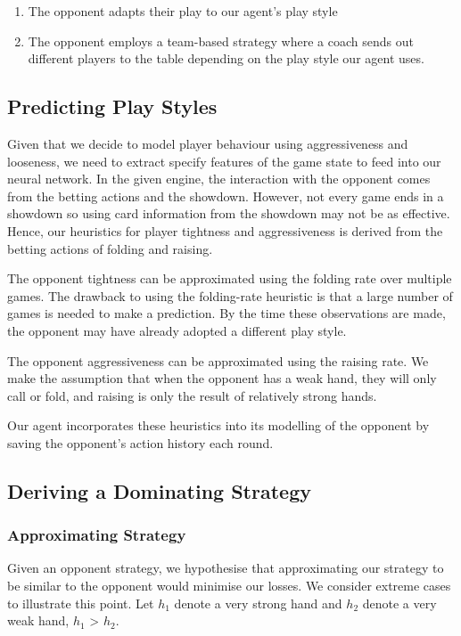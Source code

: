 \documentclass{article}
\begin{document}
\begin{enumerate}
	\item The opponent adapts their play to our agent's play style
	\item The opponent employs a team-based strategy where a coach sends out different players to the table depending on the play style our agent uses.
\end{enumerate}

\subsection{Predicting Play Styles}
Given that we decide to model player behaviour using aggressiveness and looseness, we need to extract specify features of the game state to feed into our neural network. In the given engine, the interaction with the opponent comes from the betting actions and the showdown. However, not every game ends in a showdown so using card information from the showdown may not be as effective. Hence, our heuristics for player tightness and aggressiveness is derived from the betting actions of folding and raising.

The opponent tightness can be approximated using the folding rate over multiple games. The drawback to using the folding-rate heuristic is that a large number of games is needed to make a prediction. By the time these observations are made, the opponent may have already adopted a different play style.

The opponent aggressiveness can be approximated using the raising rate. We make the assumption that when the opponent has a weak hand, they will only call or fold, and raising is only the result of relatively strong hands.

Our agent incorporates these heuristics into its modelling of the opponent by saving the opponent's action history each round.

\subsection{Deriving a Dominating Strategy}

\subsubsection{Approximating Strategy}
Given an opponent strategy, we hypothesise that approximating our strategy to be similar to the opponent would minimise our losses. We consider extreme cases to illustrate this point. Let $h_1$ denote a very strong hand and $h_2$ denote a very weak hand, $h_1$ > $h_2$.
\end{document}
